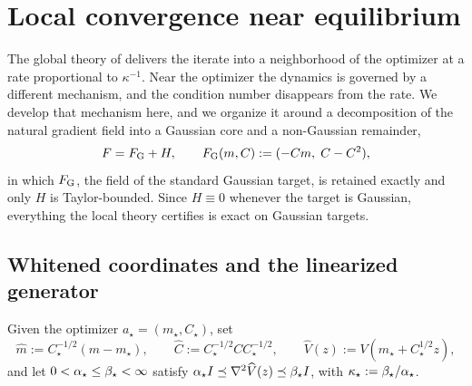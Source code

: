\section{Local convergence near equilibrium}
\label{sec:local}

The global theory of  delivers the iterate into a neighborhood of the
optimizer at a rate proportional to $\kappa^{-1}$. Near the optimizer the dynamics is governed
by a different mechanism, and the condition number disappears from the rate. We develop that
mechanism here, and we organize it around a decomposition of the natural gradient field into a
Gaussian core and a non-Gaussian remainder,
\[
    F=F_{\mathrm G}+H,
    \qquad
    F_{\mathrm G}(m,C):=(-Cm,\;C-C^2),
\]
in which $F_{\mathrm G}$, the field of the standard Gaussian target, is retained exactly and only $H$
is Taylor-bounded. Since $H\equiv0$ whenever the target is Gaussian, everything the local theory
certifies is exact on Gaussian targets.

\subsection{Whitened coordinates and the linearized generator}
\label{subsec:whitened}

\begin{definition}
\label{def:whitened}
Given the optimizer $a_\star=(m_\star,C_\star)$, set
\[
    \widehat m:=C_\star^{-1/2}(m-m_\star),
    \qquad
    \widehat C:=C_\star^{-1/2}CC_\star^{-1/2},
    \qquad
    \widehat V(z):=V(m_\star+C_\star^{1/2}z),
\]
and let $0<\alpha_\star\leq\beta_\star<\infty$ satisfy
$\alpha_\star I\preceq\nabla^2\widehat V(z)\preceq\beta_\star I$, with
$\kappa_\star:=\beta_\star/\alpha_\star$.
\end{definition}

